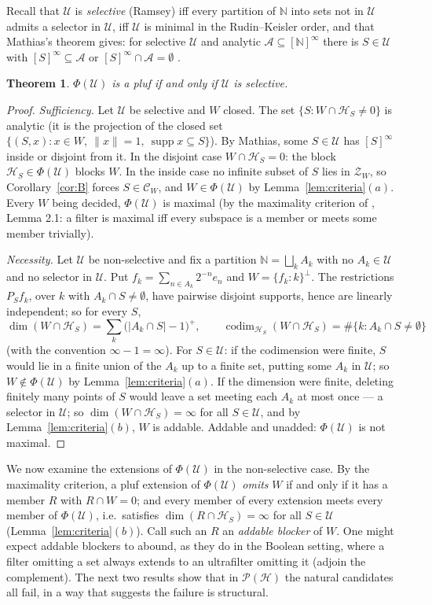 \documentclass[11pt,reqno]{amsart}
\newtheorem{theorem}{Theorem}[section]
\theoremstyle{definition}
\newcommand{\HH}{\mathcal{H}}
\newcommand{\PP}{\mathcal{P}}
\newcommand{\N}{\mathbb{N}}
\newcommand{\U}{\mathcal{U}}
\newcommand{\ZW}{\mathcal{Z}}
\newcommand{\supp}{\operatorname{supp}}
\newcommand{\cod}{\operatorname{codim}}
\begin{document}
Recall that $\U$ is \emph{selective} (Ramsey) iff every partition of $\N$ into sets not
in $\U$ admits a selector in $\U$, iff $\U$ is minimal in the Rudin--Keisler order, and
that Mathias's theorem gives: for selective $\U$ and analytic
$\mathcal A\subseteq[\N]^\infty$ there is $S\in\U$ with $[S]^\infty\subseteq\mathcal A$
or $[S]^\infty\cap\mathcal A=\emptyset$ \cite{Mathias}.

\begin{theorem}\label{thm:C}
$\Phi(\U)$ is a pluf if and only if $\U$ is selective.
\end{theorem}

\begin{proof}
\emph{Sufficiency.} Let $\U$ be selective and $W$ closed. The set
$\{S:W\cap\HH_S\neq0\}$ is analytic (it is the projection of the closed set
$\{(S,x):x\in W,\ \|x\|=1,\ \supp x\subseteq S\}$). By Mathias, some $S\in\U$ has
$[S]^\infty$ inside or disjoint from it. In the disjoint case $W\cap\HH_S=0$: the block
$\HH_S\in\Phi(\U)$ blocks $W$. In the inside case no infinite subset of $S$ lies in
$\ZW_W$, so Corollary~\ref{cor:B} forces $S\in\mathcal C_W$, and $W\in\Phi(\U)$ by
Lemma~\ref{lem:criteria}$(a)$. Every $W$ being decided, $\Phi(\U)$ is maximal (by the
maximality criterion of \cite{FWI}, Lemma 2.1: a filter is maximal iff every subspace is
a member or meets some member trivially).

\emph{Necessity.} Let $\U$ be non-selective and fix a partition
$\N=\bigsqcup_kA_k$ with no $A_k\in\U$ and no selector in $\U$. Put
$f_k=\sum_{n\in A_k}2^{-n}e_n$ and $W=\{f_k:k\}^\perp$. The restrictions
$P_Sf_k$, over $k$ with $A_k\cap S\neq\emptyset$, have pairwise disjoint supports, hence
are linearly independent; so for every $S$,
\[
\dim(W\cap\HH_S)=\sum_k\bigl(|A_k\cap S|-1\bigr)^+,\qquad
\cod_{\HH_S}(W\cap\HH_S)=\#\{k:A_k\cap S\neq\emptyset\}
\]
(with the convention $\infty-1=\infty$). For $S\in\U$: if the codimension were finite,
$S$ would lie in a finite union of the $A_k$ up to a finite set, putting some $A_k$ in
$\U$; so $W\notin\Phi(\U)$ by Lemma~\ref{lem:criteria}$(a)$. If the dimension were
finite, deleting finitely many points of $S$ would leave a set meeting each $A_k$ at
most once --- a selector in $\U$; so $\dim(W\cap\HH_S)=\infty$ for all $S\in\U$, and by
Lemma~\ref{lem:criteria}$(b)$, $W$ is addable. Addable and unadded: $\Phi(\U)$ is not
maximal.
\end{proof}

We now examine the extensions of $\Phi(\U)$ in the non-selective case. By the
maximality criterion, a pluf extension of $\Phi(\U)$ \emph{omits} $W$ if and only if
it has a member $R$ with $R\cap W=0$; and every member of every extension meets every
member of $\Phi(\U)$, i.e.\ satisfies $\dim(R\cap\HH_S)=\infty$ for all $S\in\U$
(Lemma~\ref{lem:criteria}$(b)$). Call such an $R$ an \emph{addable blocker} of $W$.
One might expect addable blockers to abound, as they do in the Boolean setting, where
a filter omitting a set always extends to an ultrafilter omitting it (adjoin the
complement). The next two results show that in $\PP(\HH)$ the natural candidates all
fail, in a way that suggests the failure is structural.
\end{document}
